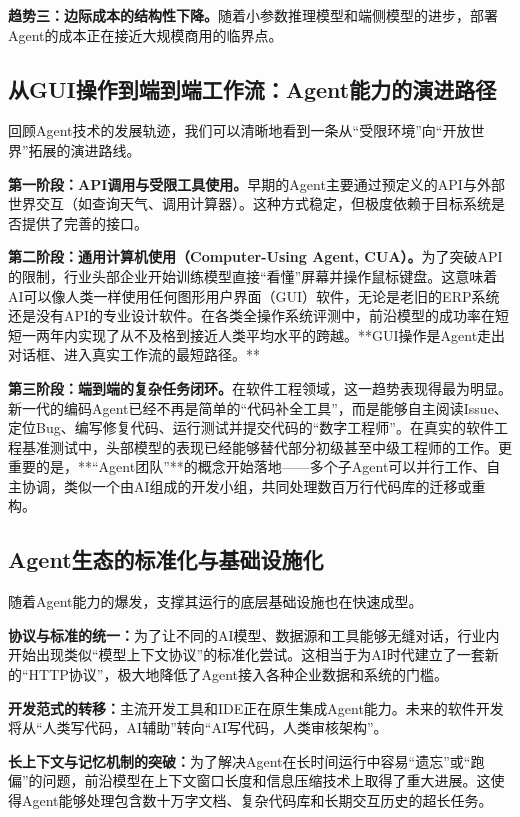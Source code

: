 		\textbf{趋势三：边际成本的结构性下降。}随着小参数推理模型和端侧模型的进步，部署Agent的成本正在接近大规模商用的临界点。

\subsection{从GUI操作到端到端工作流：Agent能力的演进路径}

回顾Agent技术的发展轨迹，我们可以清晰地看到一条从“受限环境”向“开放世界”拓展的演进路线。

\textbf{第一阶段：API调用与受限工具使用。}早期的Agent主要通过预定义的API与外部世界交互（如查询天气、调用计算器）。这种方式稳定，但极度依赖于目标系统是否提供了完善的接口。

\textbf{第二阶段：通用计算机使用（Computer-Using Agent, CUA）。}为了突破API的限制，行业头部企业开始训练模型直接“看懂”屏幕并操作鼠标键盘。这意味着AI可以像人类一样使用任何图形用户界面（GUI）软件，无论是老旧的ERP系统还是没有API的专业设计软件。在各类全操作系统评测中，前沿模型的成功率在短短一两年内实现了从不及格到接近人类平均水平的跨越。**GUI操作是Agent走出对话框、进入真实工作流的最短路径。**

\textbf{第三阶段：端到端的复杂任务闭环。}在软件工程领域，这一趋势表现得最为明显。新一代的编码Agent已经不再是简单的“代码补全工具”，而是能够自主阅读Issue、定位Bug、编写修复代码、运行测试并提交代码的“数字工程师”。在真实的软件工程基准测试中，头部模型的表现已经能够替代部分初级甚至中级工程师的工作。更重要的是，**“Agent团队”**的概念开始落地——多个子Agent可以并行工作、自主协调，类似一个由AI组成的开发小组，共同处理数百万行代码库的迁移或重构。

\subsection{Agent生态的标准化与基础设施化}

随着Agent能力的爆发，支撑其运行的底层基础设施也在快速成型。

\textbf{协议与标准的统一：}为了让不同的AI模型、数据源和工具能够无缝对话，行业内开始出现类似“模型上下文协议”的标准化尝试。这相当于为AI时代建立了一套新的“HTTP协议”，极大地降低了Agent接入各种企业数据和系统的门槛。

\textbf{开发范式的转移：}主流开发工具和IDE正在原生集成Agent能力。未来的软件开发将从“人类写代码，AI辅助”转向“AI写代码，人类审核架构”。

\textbf{长上下文与记忆机制的突破：}为了解决Agent在长时间运行中容易“遗忘”或“跑偏”的问题，前沿模型在上下文窗口长度和信息压缩技术上取得了重大进展。这使得Agent能够处理包含数十万字文档、复杂代码库和长期交互历史的超长任务。

